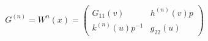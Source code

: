\begin{equation}
G^{(n)}=W^{n}(x)=\left(
\begin{array}{cc}
G_{11}(v) & h^{(n)}(v) p \\
k^{(n)}(u)p^{-1} & g_{22}(u)
\end{array} \right)
\end{equation}

